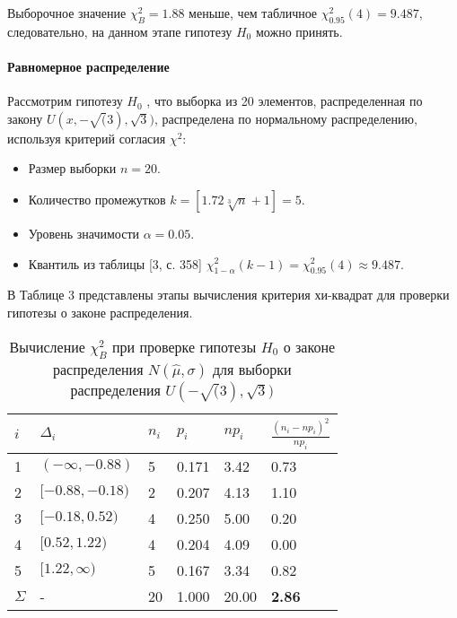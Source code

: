 \documentclass[12pt]{article}
\begin{document}
Выборочное значение $\chi_{B}^2 = 1.88$ меньше, чем табличное   $\chi_{0.95}^2(4)=9.487$, следовательно, на данном этапе гипотезу $H_0$ можно принять.
	
\paragraph{Равномерное распределение}
Рассмотрим гипотезу $H_0$ , что выборка из 20 элементов, распределенная по закону $U(x,-\sqrt(3),\sqrt{3})$, распределена по нормальному распределению, используя критерий согласия $\chi^2$:
\begin{itemize}
	\item Размер выборки $n=20$.
	\item Количество промежутков $k = [1.72\sqrt[3]{n}+1] = 5$.
	\item Уровень значимости $\alpha = 0.05$.
	\item Квантиль из таблицы [3, с. 358] $\chi^2_{1-\alpha}(k-1) = \chi^2_{0.95}(4) \approx 9.487$.
\end{itemize}

В Таблице 3 представлены этапы вычисления критерия хи-квадрат для проверки гипотезы о законе распределения.
	

		\begin{table}[H]
			\begin{center}
				\begin{tabular}{|l|l|l|l|l|l|}
				\hline
				$i$      & $\Delta_i$             & $n_i$ & $p_i$ & $n p_i$ & $\frac{(n_i - np_i)^2}{np_i}$ \\ \hline
				1        & $(-\infty, -0.88)$ & 5  & 0.171 & 3.42 & 0.73                        \\ \hline
				2        & $[-0.88, -0.18)$   & 2  & 0.207 & 4.13 & 1.10                         \\ \hline
				3        & $[-0.18, 0.52)$    & 4  & 0.250 & 5.00 & 0.20                       \\ \hline
				4        & $[0.52, 1.22)$     & 4  & 0.204 & 4.09 & 0.00                     \\ \hline
				5        & $[1.22, \infty)$   & 5  & 0.167 & 3.34 & 0.82                         \\ \hline
				$\Sigma$ & -                      & 20    & 1.000  & 20.00    &{\bf 2.86}                  \\ \hline
			\end{tabular}
			\end{center}
	\label{U}
	\caption{Вычисление $\chi_{B}^2$ при проверке гипотезы $H_0$ о законе распределения $N(\hat{\mu}, \hat{\sigma})$ для выборки распределения $U(-\sqrt(3), \sqrt{3})$}
	\end{table}
	
\end{document}
